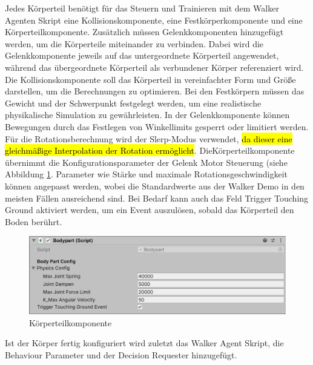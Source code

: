 Jedes Körperteil benötigt für das Steuern und Trainieren mit dem Walker Agenten Skript eine Kollisionskomponente, eine Festkörperkomponente und eine Körperteilkomponente. Zusätzlich müssen Gelenkkomponenten hinzugefügt werden, um die Körperteile miteinander zu verbinden. Dabei wird die Gelenkkomponente jeweils auf das untergeordnete Körperteil angewendet, während das übergeordnete Körperteil als verbundener Körper referenziert wird. Die Kollisionskomponente soll das Körperteil in vereinfachter Form und Größe darstellen, um die Berechnungen zu optimieren. Bei den Festkörpern müssen das Gewicht und der Schwerpunkt festgelegt werden, um eine realistische physikalische Simulation zu gewährleisten. In der Gelenkkomponente können Bewegungen durch das Festlegen von Winkellimits gesperrt oder limitiert werden. Für die Rotationsberechnung wird der Slerp-Modus verwendet, \hl{da dieser eine gleichmäßige Interpolation der Rotation ermöglicht}. DieKörperteilkomponente übernimmt die Konfigurationsparameter der Gelenk Motor Steuerung (siehe Abbildung \ref{fig:komponente_bodypart}. Parameter wie Stärke und maximale Rotationsgeschwindigkeit können angepasst werden, wobei die Standardwerte aus der Walker Demo in den meisten Fällen ausreichend sind. Bei Bedarf kann auch das Feld \grqq{}Trigger Touching Ground\grqq{} aktiviert werden, um ein Event auszulösen, sobald das Körperteil den Boden berührt.

\begin{figure}[H]
  \centering  
  \includegraphics[scale=0.5]{img/komponente_bodypart}
  \caption{Körperteilkomponente}
  \label{fig:komponente_bodypart}
\end{figure}


Ist der Körper fertig konfiguriert wird zuletzt das Walker Agent Skript, die Behaviour Parameter und der Decision Requester hinzugefügt. 

